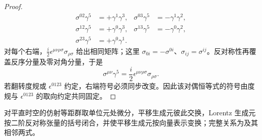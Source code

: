\begin{proof}
\begin{align*}
\sigma^{02}\gamma^5&=+\gamma^1\gamma^3,&
\sigma^{03}\gamma^5&=-\gamma^1\gamma^2,\\
\sigma^{12}\gamma^5&=+\gamma^0\gamma^3,&
\sigma^{13}\gamma^5&=-\gamma^0\gamma^2,\\
\sigma^{23}\gamma^5&=+\gamma^0\gamma^1.
\end{align*}
对每个右端，$\frac{i}{2}\epsilon^{\mu\nu\rho\sigma}\sigma_{\rho\sigma}$ 给出相同矩阵；这里 $\sigma_{0i}=-\sigma^{0i}$、$\sigma_{ij}=\sigma^{ij}$。反对称性再覆盖反序分量及零对角分量，于是
\begin{equation*}
{
\sigma^{\mu\nu}\gamma^5
=\frac{i}{2}\epsilon^{\mu\nu\rho\sigma}\sigma_{\rho\sigma}.}
\end{equation*}
若翻转度规或 $\epsilon^{0123}$ 约定，右端符号必须同步改变。因此该对偶恒等式的符号由度规与 $\epsilon^{0123}$ 的取向约定共同固定。
\end{proof}

\begin{theorem}
对平直时空的仿射等距群取单位元处微分，平移生成元彼此交换，Lorentz 生成元按二阶反对称张量的括号闭合，并使平移生成元按向量表示变换；完整关系为及其相邻两式。
\end{theorem}

